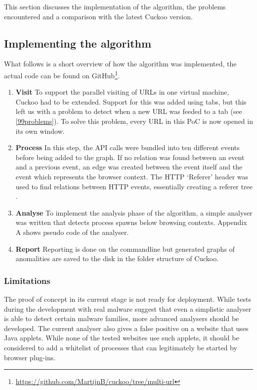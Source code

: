 This section discusses the implementation of the algorithm, the problems encountered and a comparison with the latest Cuckoo version.

\subsection{Implementing the algorithm}

What follows is a short overview of how the algorithm was implemented, the actual code can be found on GitHub\footnote{\url{https://github.com/MartijnB/cuckoo/tree/multi-url}}.

\begin{enumerate}
\item \textbf{Visit} To support the parallel visiting of URLs in one virtual machine, Cuckoo had to be extended. Support for this was added using tabs, but this left us with a problem to detect when a new URL was feeded to a tab (see \ref{99problems}). To solve this problem, every URL in this PoC is now opened in its own window.

\item \textbf{Process} In this step, the API calls were bundled into ten different events before being added to the graph. If no relation was found between an event and a previous event, an edge was created between the event itself and the event which represents the browser context. The HTTP `Referer' header was used to find relations between HTTP events, essentially creating a referer tree \cite{qui}. %

\item \textbf{Analyse} To implement the analysis phase of the algorithm, a simple analyser was written that detects process spawns below browsing contexts. Appendix A shows pseudo code of the analyser.

\item \textbf{Report} Reporting is done on the commandline but generated graphs of anomalities are saved to the disk in the folder structure of Cuckoo.
\end{enumerate}

\subsubsection{Limitations}

The proof of concept in its current stage is not ready for deployment. While tests during the development with real malware suggest that even a simplistic analyser is able to detect certain malware families, more advanced analysers should be developed. The current analyser also gives a false positive on a website that uses Java applets. While none of the tested websites use such applets, it should be considered to add a whitelist of processes that can legitimately be started by browser plug-ins.

